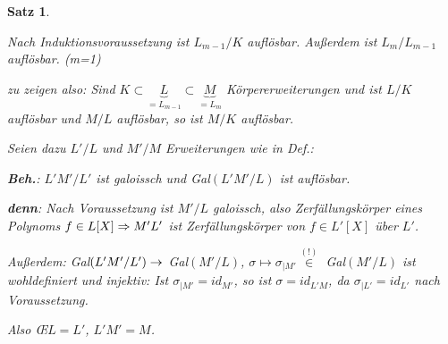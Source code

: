 \documentclass[a4paper,10pt,german]{scrbook}
\theoremstyle{saetze}
\newtheorem{Satz}{Satz}
\theoremstyle{definitionen}
\begin{document}
\begin{Satz}
{\begin{description}
Nach Induktionsvoraussetzung ist $L_{m-1}/K$ auflösbar. Außerdem ist
$L_m/L_{m-1}$ auflösbar. (m=1)

zu zeigen also: Sind $K \subset \underset{=L_{m-1}}{\underbrace{L}}
\subset \underset{=L_m}{\underbrace{M}}$ Körpererweiterungen und ist
$L/K$ auflösbar und $M/L$ auflösbar, so ist $M/K$ auflösbar.

Seien dazu $L'/L$ und $M'/M$ Erweiterungen wie in Def.:


\textbf{Beh.}: $L'M'/L'$ ist galoissch und Gal$(L'M'/L)$ ist
auflösbar.

\textbf{denn}: Nach Voraussetzung ist $M'/L$ galoissch, also
Zerfällungskörper eines Polynoms $f \in L[X] \Rightarrow M'L'$ ist
Zerfällungskörper von $f \in  L'[X]$ über $L'$.

Außerdem: Gal$(L'M'/L') \rightarrow$ Gal$(M'/L)$, $\sigma \mapsto
\sigma_{|M'} \overset{(!)}{\in}$ Gal$(M'/L)$ ist wohldefiniert
und injektiv: Ist $\sigma_{|M'} = id_{M'}$, so ist $\sigma =
id_{L'M}$, da $\sigma_{|L'} = id_{L'}$ nach Voraussetzung.

Also \OE $L=L'$, $L'M' = M$.
\end{description}}

\end{Satz}
\end{document}
